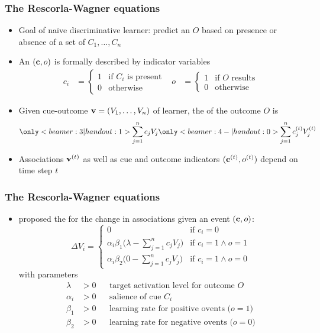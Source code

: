 \begin{frame}
  \frametitle{The Rescorla-Wagner equations}

  \begin{itemize}
  \item<1-> Goal of naïve discriminative learner: predict an  $O$ based on presence or absence of a set of  $C_1, \ldots, C_n$
  \item<2-> An  $(\vc, o)$ is formally described by indicator variables
    \begin{align*}
      c_i &= 
       \begin{cases}
         1 & \text{if $C_i$ is present} \\
         0 & \text{otherwise}
       \end{cases}
      &
      o &= 
       \begin{cases}
         1 & \text{if $O$ results} \\
         0 & \text{otherwise}
       \end{cases}
    \end{align*}
  \item<3-> Given cue-outcome  $\vv = (V_1, \ldots, V_n)$ of learner, the  of the outcome $O$ is
    \[
    \only<beamer:3| handout:1>{
      \sum_{j=1}^n c_j V_j}
    \only<beamer:4-| handout:0>{
      \sum_{j=1}^n c_j\psupt V_j\psupt}
    \]
  \item<4-> Associations $\vv[t]$ as well as cue and outcome indicators $(\vc[t], o\psupt)$ depend on time step $t$
  \end{itemize}
\end{frame}

\begin{frame}
  \frametitle{The Rescorla-Wagner equations}
  
  \begin{itemize}
  \item \citet{Rescorla:Wagner:72} proposed the  for the change in associations given an event $(\vc, o)$:
    \[
    \Delta V_i =
    \begin{cases}
      0 & \text{if } c_i = 0\\
      \alpha_i \beta_1 \bigl(\lambda - \sum_{j=1}^n c_j V_j \bigr) & \text{if } c_i = 1 \wedge o = 1 \\
      \alpha_i \beta_2 \bigl(0 - \sum_{j=1}^n c_j V_j \bigr) & \text{if } c_i = 1 \wedge o = 0 
    \end{cases}
    \]
    with parameters
    \ungap[.5]
    \begin{align*}
      \lambda &> 0   && \text{target activation level for outcome $O$} \\
      \alpha_i &> 0  && \text{salience of cue $C_i$} \\
      \beta_1 &> 0   && \text{learning rate for positive ovents ($o = 1$)} \\
      \beta_2 &> 0   && \text{learning rate for negative ovents ($o = 0$)}
    \end{align*}
  \end{itemize}
\end{frame}

